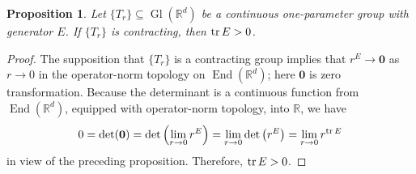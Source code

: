 \documentclass[11pt]{article}
\newtheorem{proposition}[theorem]{Proposition}
\theoremstyle{remark}
\newcommand\End{\operatorname{End}} %
\newcommand\Gl{\operatorname{Gl}} %
\renewcommand\det{\operatorname{det}}
\begin{document}
\begin{proposition}\label{prop:ContractingTrace}
Let $\{T_r\}\subseteq \Gl(\mathbb{R}^d)$ be a continuous one-parameter group with generator $E$. If $\{T_r\}$ is  contracting, then $\tr E>0$. 
\end{proposition}
\begin{proof}
The supposition that $\{T_r\}$ is a contracting group implies that $r^E\to \mathbf{0}$ as $r\to 0$ in the operator-norm topology on $\End(\mathbb{R}^d)$; here $\mathbf{0}$ is zero transformation. Because the determinant is a continuous function from $\End(\mathbb{R}^d)$, equipped with operator-norm topology, into $\mathbb{R}$, we have
\begin{equation*}
0=\det(\mathbf{0})=\det\left(\lim_{r\to 0}r^E\right)=\lim_{r\to 0}\det\left(r^E\right)=\lim_{r\to 0}r^{\tr E}
\end{equation*}
in view of the preceding proposition. Therefore, $\tr E>0$.
\end{proof}







\end{document}
